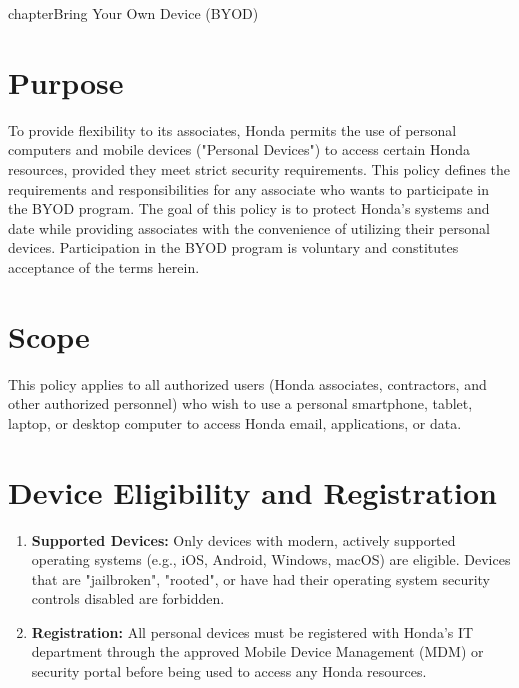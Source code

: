 chapter{Bring Your Own Device (BYOD)}
\pagestyle{fancy}

\fancyhf{}

\fancyfoot[C]{\thepage}

\renewcommand{\headrulewidth}{0pt}
\renewcommand{\footrulewidth}{0pt}

\section{Purpose}
To provide flexibility to its associates, Honda permits the use of personal computers and mobile devices ("Personal Devices") to access certain Honda resources, provided they meet strict security requirements.  This policy defines the requirements and responsibilities for any associate who wants to participate in the BYOD program.  The goal of this policy is to protect Honda's systems and date while providing associates with the convenience of utilizing their personal devices.  Participation in the BYOD program is voluntary and constitutes acceptance of the terms herein.

\section{Scope}
This policy applies to all authorized users (Honda associates, contractors, and other authorized personnel) who wish to use a personal smartphone, tablet, laptop, or desktop computer to access Honda email, applications, or data.

\section{Device Eligibility and Registration}

\begin{enumerate}
    \item \textbf{Supported Devices:} Only devices with modern, actively supported operating systems (e.g., iOS, Android, Windows, macOS) are eligible.  Devices that are "jailbroken", "rooted", or have had their operating system security controls disabled are forbidden.
    \item \textbf{Registration:} All personal devices must be registered with Honda's IT department through the approved Mobile Device Management (MDM) or security portal before being used to access any Honda resources.
\end{enumerate}

